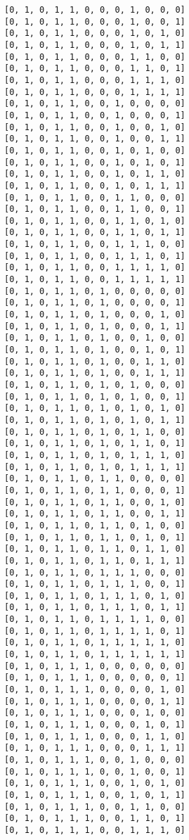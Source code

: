 \documentclass[11pt]{article}
\begin{document}
\begin{Verbatim}[commandchars=\\\{\}]
[0, 1, 0, 1, 1, 0, 0, 0, 1, 0, 0, 0]
[0, 1, 0, 1, 1, 0, 0, 0, 1, 0, 0, 1]
[0, 1, 0, 1, 1, 0, 0, 0, 1, 0, 1, 0]
[0, 1, 0, 1, 1, 0, 0, 0, 1, 0, 1, 1]
[0, 1, 0, 1, 1, 0, 0, 0, 1, 1, 0, 0]
[0, 1, 0, 1, 1, 0, 0, 0, 1, 1, 0, 1]
[0, 1, 0, 1, 1, 0, 0, 0, 1, 1, 1, 0]
[0, 1, 0, 1, 1, 0, 0, 0, 1, 1, 1, 1]
[0, 1, 0, 1, 1, 0, 0, 1, 0, 0, 0, 0]
[0, 1, 0, 1, 1, 0, 0, 1, 0, 0, 0, 1]
[0, 1, 0, 1, 1, 0, 0, 1, 0, 0, 1, 0]
[0, 1, 0, 1, 1, 0, 0, 1, 0, 0, 1, 1]
[0, 1, 0, 1, 1, 0, 0, 1, 0, 1, 0, 0]
[0, 1, 0, 1, 1, 0, 0, 1, 0, 1, 0, 1]
[0, 1, 0, 1, 1, 0, 0, 1, 0, 1, 1, 0]
[0, 1, 0, 1, 1, 0, 0, 1, 0, 1, 1, 1]
[0, 1, 0, 1, 1, 0, 0, 1, 1, 0, 0, 0]
[0, 1, 0, 1, 1, 0, 0, 1, 1, 0, 0, 1]
[0, 1, 0, 1, 1, 0, 0, 1, 1, 0, 1, 0]
[0, 1, 0, 1, 1, 0, 0, 1, 1, 0, 1, 1]
[0, 1, 0, 1, 1, 0, 0, 1, 1, 1, 0, 0]
[0, 1, 0, 1, 1, 0, 0, 1, 1, 1, 0, 1]
[0, 1, 0, 1, 1, 0, 0, 1, 1, 1, 1, 0]
[0, 1, 0, 1, 1, 0, 0, 1, 1, 1, 1, 1]
[0, 1, 0, 1, 1, 0, 1, 0, 0, 0, 0, 0]
[0, 1, 0, 1, 1, 0, 1, 0, 0, 0, 0, 1]
[0, 1, 0, 1, 1, 0, 1, 0, 0, 0, 1, 0]
[0, 1, 0, 1, 1, 0, 1, 0, 0, 0, 1, 1]
[0, 1, 0, 1, 1, 0, 1, 0, 0, 1, 0, 0]
[0, 1, 0, 1, 1, 0, 1, 0, 0, 1, 0, 1]
[0, 1, 0, 1, 1, 0, 1, 0, 0, 1, 1, 0]
[0, 1, 0, 1, 1, 0, 1, 0, 0, 1, 1, 1]
[0, 1, 0, 1, 1, 0, 1, 0, 1, 0, 0, 0]
[0, 1, 0, 1, 1, 0, 1, 0, 1, 0, 0, 1]
[0, 1, 0, 1, 1, 0, 1, 0, 1, 0, 1, 0]
[0, 1, 0, 1, 1, 0, 1, 0, 1, 0, 1, 1]
[0, 1, 0, 1, 1, 0, 1, 0, 1, 1, 0, 0]
[0, 1, 0, 1, 1, 0, 1, 0, 1, 1, 0, 1]
[0, 1, 0, 1, 1, 0, 1, 0, 1, 1, 1, 0]
[0, 1, 0, 1, 1, 0, 1, 0, 1, 1, 1, 1]
[0, 1, 0, 1, 1, 0, 1, 1, 0, 0, 0, 0]
[0, 1, 0, 1, 1, 0, 1, 1, 0, 0, 0, 1]
[0, 1, 0, 1, 1, 0, 1, 1, 0, 0, 1, 0]
[0, 1, 0, 1, 1, 0, 1, 1, 0, 0, 1, 1]
[0, 1, 0, 1, 1, 0, 1, 1, 0, 1, 0, 0]
[0, 1, 0, 1, 1, 0, 1, 1, 0, 1, 0, 1]
[0, 1, 0, 1, 1, 0, 1, 1, 0, 1, 1, 0]
[0, 1, 0, 1, 1, 0, 1, 1, 0, 1, 1, 1]
[0, 1, 0, 1, 1, 0, 1, 1, 1, 0, 0, 0]
[0, 1, 0, 1, 1, 0, 1, 1, 1, 0, 0, 1]
[0, 1, 0, 1, 1, 0, 1, 1, 1, 0, 1, 0]
[0, 1, 0, 1, 1, 0, 1, 1, 1, 0, 1, 1]
[0, 1, 0, 1, 1, 0, 1, 1, 1, 1, 0, 0]
[0, 1, 0, 1, 1, 0, 1, 1, 1, 1, 0, 1]
[0, 1, 0, 1, 1, 0, 1, 1, 1, 1, 1, 0]
[0, 1, 0, 1, 1, 0, 1, 1, 1, 1, 1, 1]
[0, 1, 0, 1, 1, 1, 0, 0, 0, 0, 0, 0]
[0, 1, 0, 1, 1, 1, 0, 0, 0, 0, 0, 1]
[0, 1, 0, 1, 1, 1, 0, 0, 0, 0, 1, 0]
[0, 1, 0, 1, 1, 1, 0, 0, 0, 0, 1, 1]
[0, 1, 0, 1, 1, 1, 0, 0, 0, 1, 0, 0]
[0, 1, 0, 1, 1, 1, 0, 0, 0, 1, 0, 1]
[0, 1, 0, 1, 1, 1, 0, 0, 0, 1, 1, 0]
[0, 1, 0, 1, 1, 1, 0, 0, 0, 1, 1, 1]
[0, 1, 0, 1, 1, 1, 0, 0, 1, 0, 0, 0]
[0, 1, 0, 1, 1, 1, 0, 0, 1, 0, 0, 1]
[0, 1, 0, 1, 1, 1, 0, 0, 1, 0, 1, 0]
[0, 1, 0, 1, 1, 1, 0, 0, 1, 0, 1, 1]
[0, 1, 0, 1, 1, 1, 0, 0, 1, 1, 0, 0]
[0, 1, 0, 1, 1, 1, 0, 0, 1, 1, 0, 1]
[0, 1, 0, 1, 1, 1, 0, 0, 1, 1, 1, 0]

\end{Verbatim}
\end{document}
